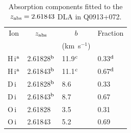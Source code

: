 \documentclass[useAMS,usenatbib]{mn2e}
\begin{document}
\begin{table}
\centering
    \caption{{Absorption components fitted to the
$z_{\rm abs} = 2.61843$ DLA in Q0913+072.}}
    \begin{tabular}{@{}llll}
    \hline
    \multicolumn{1}{c}{Ion}
& \multicolumn{1}{c}{$z_{\rm abs}$}
& \multicolumn{1}{c}{$b$}
& \multicolumn{1}{c}{Fraction}\\
    \multicolumn{1}{c}{}
& \multicolumn{1}{c}{}
& \multicolumn{1}{c}{(km~s$^{-1}$)}
& \multicolumn{1}{c}{}\\
    \hline
H\,{\sc i}$^{\rm a}$ & 2.61828$^{\rm b}$    & 11.9$^{\rm c}$  &  0.33$^{\rm d}$ \\
H\,{\sc i}$^{\rm a}$ & 2.61843$^{\rm b}$    & 11.1$^{\rm c}$  &  0.67$^{\rm d}$ \\
D\,{\sc i} & 2.61828$^{\rm b}$    & 8.6  &  0.33 \\
D\,{\sc i} & 2.61843$^{\rm b}$    & 8.7  &  0.67 \\
O\,{\sc i} & 2.61828    & 3.5  &  0.31 \\
O\,{\sc i} & 2.61843    & 5.2  &  0.69 \\
    \hline
    \end{tabular}

    \label{tab:Q0913_cloudmodel}
\end{table}
\end{document}

